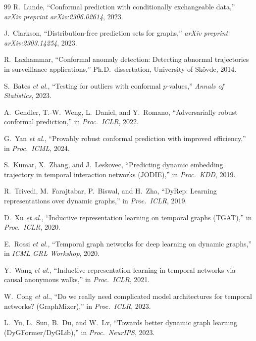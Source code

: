 \documentclass[12pt,a4paper]{article}
\theoremstyle{definition}
\theoremstyle{remark}
\begin{document}
\begin{thebibliography}{99}
R.~Lunde, ``Conformal prediction with conditionally exchangeable data,'' \emph{arXiv preprint arXiv:2306.02614}, 2023.

J.~Clarkson, ``Distribution-free prediction sets for graphs,'' \emph{arXiv preprint arXiv:2303.14254}, 2023.

R.~Laxhammar, ``Conformal anomaly detection: Detecting abnormal trajectories in surveillance applications,'' Ph.D.\ dissertation, University of Sk\"ovde, 2014.

S.~Bates \emph{et al.}, ``Testing for outliers with conformal $p$-values,'' \emph{Annals of Statistics}, 2023.

A.~Gendler, T.-W.~Weng, L.~Daniel, and Y.~Romano, ``Adversarially robust conformal prediction,'' in \emph{Proc.\ ICLR}, 2022.

G.~Yan \emph{et al.}, ``Provably robust conformal prediction with improved efficiency,'' in \emph{Proc.\ ICML}, 2024.

S.~Kumar, X.~Zhang, and J.~Leskovec, ``Predicting dynamic embedding trajectory in temporal interaction networks ({JODIE}),'' in \emph{Proc.\ KDD}, 2019.

R.~Trivedi, M.~Farajtabar, P.~Biswal, and H.~Zha, ``{DyRep}: Learning representations over dynamic graphs,'' in \emph{Proc.\ ICLR}, 2019.

D.~Xu \emph{et al.}, ``Inductive representation learning on temporal graphs ({TGAT}),'' in \emph{Proc.\ ICLR}, 2020.

E.~Rossi \emph{et al.}, ``Temporal graph networks for deep learning on dynamic graphs,'' in \emph{ICML GRL Workshop}, 2020.

Y.~Wang \emph{et al.}, ``Inductive representation learning in temporal networks via causal anonymous walks,'' in \emph{Proc.\ ICLR}, 2021.

W.~Cong \emph{et al.}, ``Do we really need complicated model architectures for temporal networks? ({GraphMixer}),'' in \emph{Proc.\ ICLR}, 2023.

L.~Yu, L.~Sun, B.~Du, and W.~Lv, ``Towards better dynamic graph learning ({DyGFormer}/{DyGLib}),'' in \emph{Proc.\ NeurIPS}, 2023.


\end{thebibliography}
\end{document}
